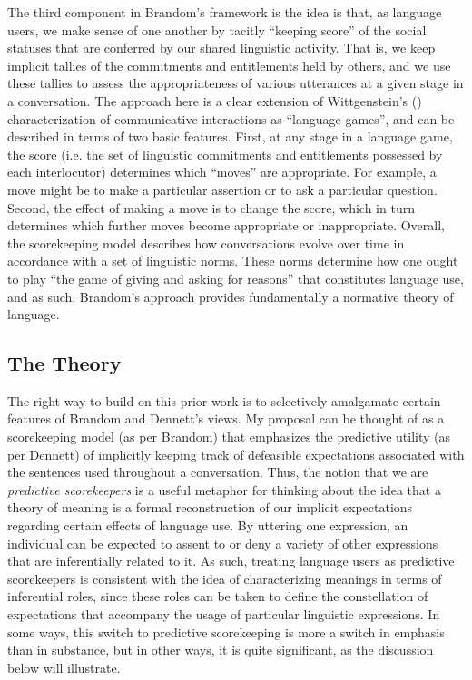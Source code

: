 The third component in Brandom's framework is the idea is that, as language users, we make sense of one another by tacitly ``keeping score'' of the social statuses that are conferred by our shared linguistic activity. That is, we keep implicit tallies of the commitments and entitlements held by others, and we use these tallies to assess the appropriateness of various utterances at a given stage in a conversation. The approach here is a clear extension of Wittgenstein's (\citeyear{Wittgenstein:1953}) characterization of communicative interactions as ``language games'', and can be described in terms of two basic features. First, at any stage in a language game, the score (i.e. the set of linguistic commitments and entitlements possessed by each interlocutor) determines which ``moves'' are appropriate. For example, a move might be to make a particular assertion or to ask a particular question. Second, the effect of making a move is to change the score, which in turn determines which further moves become appropriate or inappropriate. Overall, the scorekeeping model describes how conversations evolve over time in accordance with a set of linguistic norms. These norms determine how one ought to play ``the game of giving and asking for reasons'' \citep[][p. 23]{Brandom:1994} that constitutes language use, and as such, Brandom's approach provides fundamentally a normative theory of language.

\subsection{The Theory}

The right way to build on this prior work is to selectively amalgamate certain features of Brandom and Dennett's views. My proposal can be thought of as a scorekeeping model (as per Brandom) that emphasizes the predictive utility (as per Dennett) of implicitly keeping track of defeasible expectations associated with the sentences used throughout a conversation. Thus, the notion that we are \textit{predictive scorekeepers} is a useful metaphor for thinking about the idea that a theory of meaning is a formal reconstruction of our implicit expectations regarding certain effects of language use. By uttering one expression, an individual can be expected to assent to or deny a variety of other expressions that are inferentially related to it. As such, treating language users as predictive scorekeepers is consistent with the idea of characterizing meanings in terms of inferential roles, since these roles can be taken to define the constellation of expectations that accompany the usage of particular linguistic expressions. In some ways, this switch to predictive scorekeeping is more a switch in emphasis than in substance, but in other ways, it is quite significant, as the discussion below will illustrate.


